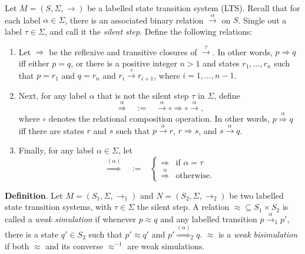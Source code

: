 \documentclass[12pt]{article}
\begin{document}
Let $M=(S,\Sigma,\rightarrow)$ be a labelled state transition system (LTS).  Recall that for each label $\alpha \in \Sigma$, there is an associated binary relation $\stackrel{\alpha}{\rightarrow}$ on $S$.  Single out a label $\tau\in \Sigma$, and call it the \emph{silent step}.  Define the following relations:
\begin{enumerate}
\item Let $\Rightarrow$ be the reflexive and transitive closures of $\stackrel{\tau}{\rightarrow}$.  In other words, $p \Rightarrow q$ iff either $p=q$, or there is a positive integer $n>1$ and states $r_1,\ldots, r_n$ such that $p= r_1$ and $q=r_n$ and $r_i \stackrel{\tau}{\rightarrow}  r_{i+1}$, where $i=1,\ldots, n-1$.
\item Next, for any label $\alpha$ that is not the silent step $\tau$ in $\Sigma$, define $$\stackrel{\alpha}{\Rightarrow}\;\;\; := \;\;\; \stackrel{\alpha}{\rightarrow} \circ \Rightarrow \circ \stackrel{\alpha}{\rightarrow},$$
where $\circ$ denotes the relational composition operation.  In other words, $p \stackrel{\alpha}{\Rightarrow} q$ iff there are states $r$ and $s$ such that $p \stackrel{\alpha}{\rightarrow} r$, $r \Rightarrow s$, and $s \stackrel{\alpha}{\rightarrow} q$.
\item Finally, for any label $\alpha\in \Sigma$, let 
\begin{displaymath}
\stackrel{(\alpha)}{\Rightarrow}\;\;\; := \;\;\; \left\{
\begin{array}{ll}
\Rightarrow & \mbox{if }\alpha=\tau\\
\stackrel{\alpha}{\Rightarrow} & \textrm{otherwise.}
\end{array}
\right.
\end{displaymath}
\end{enumerate}

\textbf{Definition}.  Let $M=(S_1,\Sigma,\rightarrow_1)$ and $N=(S_2,\Sigma,\rightarrow_2)$ be two labelled state transition systems, with $\tau \in \Sigma$ the silent step.  A relation $\approx \subseteq S_1 \times S_2$ is called a \emph{weak simulation} if whenever $p \approx q$ and any labelled transition $p \stackrel{\alpha}{\rightarrow}_1 p'$, there is a state $q'\in S_2$ such that $p' \approx q'$ and $p' \stackrel{(\alpha)}{\Rightarrow}_2 q$.  $\approx$ is a \emph{weak bisimulation} if both $\approx$ and its converse $\approx^{-1}$ are weak simulations.

\end{document}
